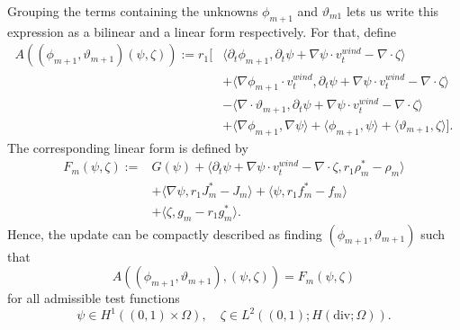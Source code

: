 Grouping the terms containing the unknowns $\phi_{m+1}$ and $\vartheta_{m1}$ lets us write this expression as a bilinear and a linear form respectively. For that, define
\begin{align*}
	A\left((\phi_{m+1},\vartheta_{m+1})(\psi,\zeta)\right) := r_1\Big[&\Big\langle\partial_t\phi_{m+1}, \partial_t\psi + \nabla\psi \cdot v_t^{wind} - \nabla \cdot \zeta\rangle\\
																  &+\langle\nabla\phi_{m+1} \cdot v_t^{wind},\partial_t\psi + \nabla\psi \cdot v_t^{wind} - \nabla \cdot \zeta\rangle\\
																  &-\langle\nabla \cdot \vartheta_{m+1},\partial_t\psi + \nabla\psi \cdot v_t^{wind} - \nabla \cdot \zeta\rangle\\
																  &+\langle\nabla\phi_{m+1},\nabla\psi\rangle + \langle\phi_{m+1},\psi\rangle + \langle\vartheta_{m+1},\zeta\rangle\Big].
		\end{align*}
The corresponding linear form is defined by 
\begin{align*}
	F_m(\psi,\zeta) := &G(\psi) + \langle\partial_t\psi + \nabla\psi \cdot v_t^{wind} - \nabla \cdot\zeta, r_1\rho_m^*-\rho_m\rangle\\
					 &+\langle\nabla\psi, r_1 J_m^* - J_m\rangle + \langle\psi, r_1f_m^*-f_m\rangle\\
					 &+\langle\zeta,g_m-r_1g_m^*\rangle.
\end{align*}
Hence, the update can be compactly described as finding $(\phi_{m+1},\vartheta_{m+1})$ such that
$$
A\left((\phi_{m+1},\vartheta_{m+1}),(\psi,\zeta)\right) = F_m(\psi,\zeta)
$$
for all admissible test functions
$$
\psi\in H^1((0,1)\times\Omega),\quad\zeta\in L^2((0,1); H(\mathrm{div};\Omega)).
$$

